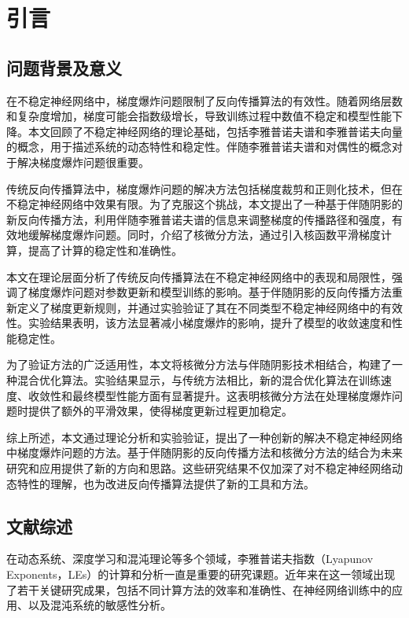 
\chapter{引言}

\section{问题背景及意义}

在不稳定神经网络中，梯度爆炸问题限制了反向传播算法的有效性。随着网络层数和复杂度增加，梯度可能会指数级增长，导致训练过程中数值不稳定和模型性能下降。本文回顾了不稳定神经网络的理论基础，包括李雅普诺夫谱和李雅普诺夫向量的概念，用于描述系统的动态特性和稳定性。伴随李雅普诺夫谱和对偶性的概念对于解决梯度爆炸问题很重要。

传统反向传播算法中，梯度爆炸问题的解决方法包括梯度裁剪和正则化技术，但在不稳定神经网络中效果有限。为了克服这个挑战，本文提出了一种基于伴随阴影的新反向传播方法，利用伴随李雅普诺夫谱的信息来调整梯度的传播路径和强度，有效地缓解梯度爆炸问题。同时，介绍了核微分方法，通过引入核函数平滑梯度计算，提高了计算的稳定性和准确性。

本文在理论层面分析了传统反向传播算法在不稳定神经网络中的表现和局限性，强调了梯度爆炸问题对参数更新和模型训练的影响。基于伴随阴影的反向传播方法重新定义了梯度更新规则，并通过实验验证了其在不同类型不稳定神经网络中的有效性。实验结果表明，该方法显著减小梯度爆炸的影响，提升了模型的收敛速度和性能稳定性。

为了验证方法的广泛适用性，本文将核微分方法与伴随阴影技术相结合，构建了一种混合优化算法。实验结果显示，与传统方法相比，新的混合优化算法在训练速度、收敛性和最终模型性能方面有显著提升。这表明核微分方法在处理梯度爆炸问题时提供了额外的平滑效果，使得梯度更新过程更加稳定。

综上所述，本文通过理论分析和实验验证，提出了一种创新的解决不稳定神经网络中梯度爆炸问题的方法。基于伴随阴影的反向传播方法和核微分方法的结合为未来研究和应用提供了新的方向和思路。这些研究结果不仅加深了对不稳定神经网络动态特性的理解，也为改进反向传播算法提供了新的工具和方法。

\section{文献综述}

在动态系统、深度学习和混沌理论等多个领域，李雅普诺夫指数（Lyapunov Exponents，LEs）的计算和分析一直是重要的研究课题。近年来在这一领域出现了若干关键研究成果，包括不同计算方法的效率和准确性、在神经网络训练中的应用、以及混沌系统的敏感性分析。

